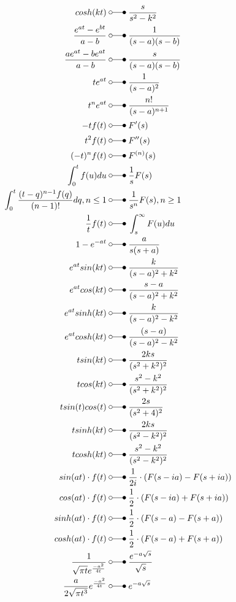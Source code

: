 \begin{align*}
    cosh(kt)                        \;&\laplace\; \frac{s}{s^2-k^2} \\
    \frac{e^{at}-e^{bt}}{a-b}       \;&\laplace\; \frac{1}{(s-a)(s-b)} \\
    \frac{ae^{at}-be^{at}}{a-b}     \;&\laplace\; \frac{s}{(s-a)(s-b)} \\
    te^{at}                         \;&\laplace\; \frac{1}{(s-a)^2}  \\
    t^{n}e^{at}                     \;&\laplace\; \frac{n!}{(s-a)^{n+1}}  \\
    -tf(t)                          \;&\laplace\; F^{\prime}(s)  \\
    t^{2}f(t)                       \;&\laplace\; F^{\prime\prime}(s)  \\
    (-t)^n f(t)                     \;&\laplace\; F^{(n)}(s)  \\
    \int_{0}^{t}f(u)du              \;&\laplace\; \frac{1}{s}F(s)  \\
    \int_{0}^{t}\frac{(t-q)^{n-1}f(q)}{(n-1)!}dq,n \leq 1 \;&\laplace\; \frac{1}{s^n}F(s),n \geq 1  \\
    \frac{1}{t}f(t)                 \;&\laplace\; \int_{s}^{\infty}F(u)du  \\
    1-e^{-at}                       \;&\laplace\; \frac{a}{s(s+a)}  \\
    e^{at}sin(kt)                   \;&\laplace\; \frac{k}{(s-a)^2+k^2}  \\
    e^{at}cos(kt)                   \;&\laplace\; \frac{s-a}{(s-a)^2+k^2}  \\
    e^{at}sinh(kt)                  \;&\laplace\; \frac{k}{(s-a)^2-k^2}  \\
    e^{at}cosh(kt)                  \;&\laplace\; \frac{(s-a)}{(s-a)^2-k^2}  \\
    tsin(kt)                        \;&\laplace\; \frac{2ks}{(s^2+k^2)^2}  \\
    tcos(kt)                        \;&\laplace\; \frac{s^2-k^2}{(s^2+k^2)^2}  \\
    tsin(t)cos(t)                   \;&\laplace\; \frac{2s}{(s^2+4)^2}  \\
    tsinh(kt)                       \;&\laplace\; \frac{2ks}{(s^2-k^2)^2}  \\
    tcosh(kt)                       \;&\laplace\; \frac{s^2-k^2}{(s^2-k^2)^2}  \\
    sin(at)\cdot f(t)               \;&\laplace\; \frac{1}{2i}\cdot(F(s-ia)-F(s+ia)) \\
    cos(at)\cdot f(t)               \;&\laplace\; \frac{1}{2}\cdot(F(s-ia)+F(s+ia)) \\
    sinh(at)\cdot f(t)              \;&\laplace\; \frac{1}{2}\cdot(F(s-a)-F(s+a)) \\
    cosh(at)\cdot f(t)              \;&\laplace\; \frac{1}{2}\cdot(F(s-a)+F(s+a)) \\
    \frac{1}{\sqrt{\pi t}e^{\frac{-a^2}{4t}}} \;&\laplace\; \frac{e^{-a\sqrt{s}}}{\sqrt{s}} \\
    \frac{a}{2\sqrt{\pi t^3}}e^{\frac{-a^2}{4t}} \;&\laplace\; e^{-a\sqrt{s}}
\end{align*}
